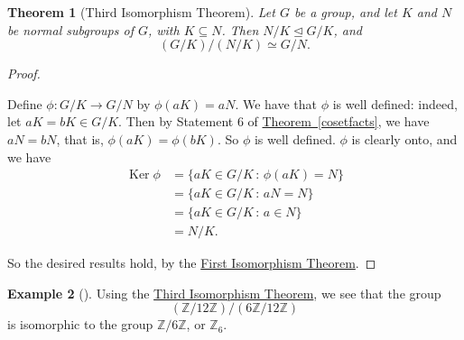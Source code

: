 \documentclass[10pt,]{book}
\theoremstyle{plain}
\newtheorem{theorem}{Theorem}[section]
\theoremstyle{definition}
\theoremstyle{definition}
\theoremstyle{definition}
\newtheorem{example}[theorem]{Example}
\theoremstyle{definition}
\numberwithin{equation}{section}
\def\Z{\mathbb{Z}}
\DeclareMathOperator{\Ker}{Ker}
\newcommand{\amp}{&}
\begin{document}
\begin{theorem}[{Third Isomorphism Theorem}]\label{tit}
Let \(G\) be a group, and let \(K\) and \(N\) be normal subgroups of \(G\), with \(K\subseteq N\). Then \(N/K \unlhd G/K\), and%
\begin{equation*}
(G/K)/(N/K)\simeq G/N.
\end{equation*}
%
\end{theorem}
\begin{proof}\hypertarget{proof-56}{}
Define \(\phi: G/K\to G/N\) by \(\phi(aK)=aN\). We have that \(\phi\) is well defined: indeed, let \(aK=bK \in G/K\). Then by Statement 6 of \hyperref[cosetfacts]{Theorem~\ref{cosetfacts}}, we have \(aN=bN\), that is, \(\phi(aK)=\phi(bK)\). So \(\phi\) is well defined. \(\phi\) is clearly onto, and we have%
\begin{align*}
\Ker \phi\amp =\{aK\in
G/K\,:\,\phi(aK)=N\}\\
\amp =\{aK\in G/K\,:\,aN=N\}\\
\amp =\{aK\in
G/K\,:\,a\in N\}\\
\amp =N/K.
\end{align*}
%
\par
So the desired results hold, by the \hyperref[fit]{First Isomorphism Theorem}.%
\end{proof}
\begin{example}[]\label{example-88}
Using the \hyperref[tit]{Third Isomorphism Theorem}, we see that the group%
\begin{equation*}
(\Z/12\Z)/(6\Z/12\Z)
\end{equation*}
is isomorphic to the group \(\Z/6\Z\), or \(\Z_6\).%
\end{example}
\typeout{************************************************}
\typeout{************************************************}
\end{document}
